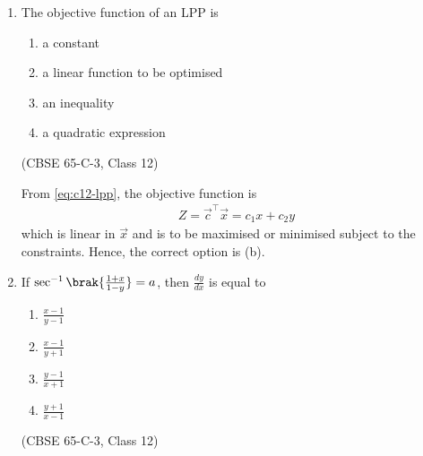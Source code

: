 \begin{enumerate}[label=\thesubsection.\arabic*., ref=\thesubsection.\theenumi]
\solution Let $A$ and $B$ be the events that the respective person solves the question. Then
\begin{align}
\Pr\brak{A}=\frac{1}{3},\quad \Pr\brak{B}=\frac{1}{5}
\end{align}
The question is solved unless both fail. From \eqref{eq:c12-comp},
\begin{align}
\Pr\brak{A+B} &= 1-\Pr\brak{A'}\Pr\brak{B'}
= 1-\brak{\frac{2}{3}}\brak{\frac{4}{5}} = \frac{7}{15}
\end{align}
Hence, the correct option is (a).
 
\begin{center}
\end{center}
 
\item The objective function of an LPP is
\begin{enumerate}
\item a constant
\item a linear function to be optimised
\item an inequality
\item a quadratic expression
\end{enumerate}
\hfill (CBSE 65-C-3, Class 12)
 
\solution From \eqref{eq:c12-lpp}, the objective function is
\begin{align}
Z = \vec{c}^{\top}\vec{x} = c_1x+c_2y
\end{align}
which is linear in $\vec{x}$ and is to be maximised or minimised subject to the constraints. Hence, the correct option is (b).
 
\begin{center}
\end{center}
 
\item If $\sec^{-1}\brak{\frac{1+x}{1-y}}=a$, then $\frac{dy}{dx}$ is equal to
\begin{enumerate}
\item $\frac{x-1}{y-1}$
\item $\frac{x-1}{y+1}$
\item $\frac{y-1}{x+1}$
\item $\frac{y+1}{x-1}$
\end{enumerate}
\hfill (CBSE 65-C-3, Class 12)
 

\end{enumerate}
